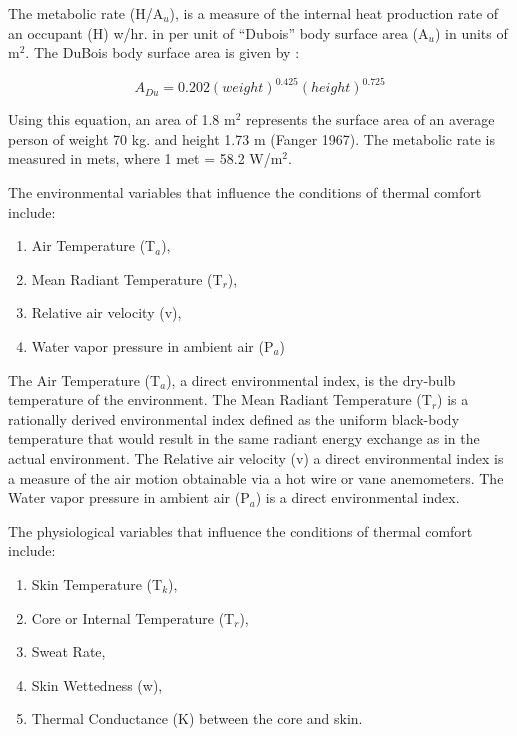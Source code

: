 The metabolic rate (H/A\(_{u}\)), is a measure of the internal heat production rate of an occupant (H) w/hr. in per unit of ``Dubois'' body surface area (A\(_{u}\)) in units of m\(^{2}\). The DuBois body surface area is given by :

\begin{equation}
{A_{Du}} = 0.202{(weight)^{0.425}}{(height)^{0.725}}
\end{equation}

Using this equation, an area of 1.8 m\(^{2}\) represents the surface area of an average person of weight 70 kg. and height 1.73 m (Fanger 1967). The metabolic rate is measured in mets, where 1 met = 58.2 W/m\(^{2}\).

The environmental variables that influence the conditions of thermal comfort include:

\begin{enumerate}
\def\labelenumi{(\arabic{enumi})}
\item
  Air Temperature (T\(_{a}\)),
\item
  Mean Radiant Temperature (T\(_{r}\)),
\item
  Relative air velocity (v),
\item
  Water vapor pressure in ambient air (P\(_{a}\))
\end{enumerate}

The Air Temperature (T\(_{a}\)), a direct environmental index, is the dry-bulb temperature of the environment. The Mean Radiant Temperature (T\(_{r}\)) is a rationally derived environmental index defined as the uniform black-body temperature that would result in the same radiant energy exchange as in the actual environment. The Relative air velocity (v) a direct environmental index is a measure of the air motion obtainable via a hot wire or vane anemometers. The Water vapor pressure in ambient air (P\(_{a}\)) is a direct environmental index.

The physiological variables that influence the conditions of thermal comfort include:

\begin{enumerate}
\def\labelenumi{(\arabic{enumi})}
\item
  Skin Temperature (T\(_{k}\)),
\item
  Core or Internal Temperature (T\(_{r}\)),
\item
  Sweat Rate,
\item
  Skin Wettedness (w),
\item
  Thermal Conductance (K) between the core and skin.
\end{enumerate}

